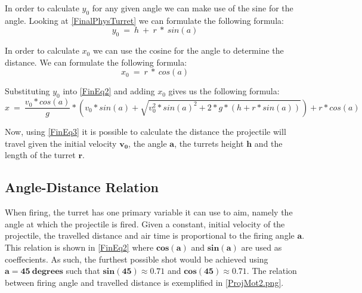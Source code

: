 In order to calculate $y_0$ for any given angle we can make use of the sine for
the angle. Looking at \autoref{FinalPhysTurret} we can formulate the following
formula:
\begin{equation}\label{Y0Eq}
y_0\ =\ h\ +\ r\ *\ sin(a)
\end{equation}

In order to calculate $x_0$ we can use the cosine for the angle to determine the
distance. We can formulate the following formula:
\begin{equation}\label{Y0Eq}
x_0\ =\ r\ *\ cos(a)
\end{equation}

Substituting $y_0$ into \autoref{FinEq2} and adding $x_0$ gives
us the following formula:
\begin{equation}\label{FinEq3}
x\ =\ \frac{v_0*cos(a)}{g}* \left(
v_0*sin(a)+\sqrt{v_0^2*sin(a)^2+2*g*(h+r*sin(a))}\right)+r*cos(a)
\end{equation}

Now, using \autoref{FinEq3} it is possible to calculate the
distance the projectile will travel given the initial velocity $\mathbf{v_0}$,
the angle $\mathbf{a}$, the turrets height $\mathbf{h}$ and the length of the
turret $\mathbf{r}$.

\subsection{Angle-Distance Relation}
When firing, the turret has one primary variable it can use to aim,
namely the angle at which the projectile is fired. Given a constant, initial
velocity of the projectile, the travelled distance and air time is proportional
to the firing angle $\mathbf{a}$. This relation is shown in \autoref{FinEq2}
where $\mathbf{cos(a)}$ and $\mathbf{sin(a)}$ are used as coeffecients. As
such, the furthest possible shot would be achieved using $\mathbf{a=45\
degrees}$ such that $\mathbf{sin(45)\approx 0.71}$ and $\mathbf{cos(45)\approx
0.71}$. The relation between firing angle and travelled distance is exemplified
in \autoref{ProjMot2.png}.




